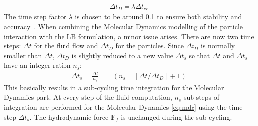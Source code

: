 \begin{align}
\Delta \mathit{t}_{D}=\lambda \Delta \mathit{t}_{cr}
\end{align}
The time step factor $\lambda$ is chosen to be around 0.1 to ensure both stability and accuracy~\citep{He1997}. When combining the Molecular Dynamics modelling of the particle interaction with the LB formulation, a minor issue arises. There are now two time steps: $\Delta t$ for the fluid flow and $\Delta t_{D}$ for the particles. Since $\Delta t_{D}$ is normally smaller than $\Delta t$, $\Delta t_{D}$ is slightly reduced to a new value $\Delta t_{s}$ so that $\Delta t$ and $\Delta t_{s}$ have an integer ration $\mathit{n}_{\mathit{s}}$:
\begin{align}
\Delta t_{s}=\frac{\Delta t}{\mathit{n}_{s}} \qquad(\mathit{n}_{s}=[\Delta t/ \Delta t_{D}]+1)
\end{align} 
This basically results in a sub-cycling time integration for the Molecular Dynamics part. At every step of the fluid computation, $\mathit{n}_{s}$ sub-steps of integration are performed for the Molecular Dynamics \cref{eq:mde} using the time step $\Delta t_{s}$. The hydrodynamic force $\mathbf{F}_{f}$ is unchanged during the sub-cycling. 